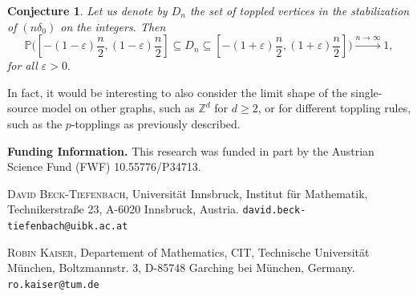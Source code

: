 \documentclass[11pt]{article}
\newtheorem{conj}{Conjecture}[section]
\newcommand{\Z}{\mathbb{Z}}
\newcommand{\prob}{\mathbb{P}}
\begin{document}
\begin{conj}
    Let us denote by $D_n$ the set of toppled vertices in the stabilization of $(n\delta_0)$ on the integers. Then
    $$\prob\bigg([-(1-\varepsilon)\frac{n}{2},(1-\varepsilon)\frac{n}{2}]\subseteq D_n \subseteq [-(1+\varepsilon)\frac{n}{2},(1+\varepsilon)\frac{n}{2}]\bigg)\xrightarrow{n\rightarrow\infty}1,$$
    for all $\varepsilon>0.$
\end{conj}
In fact, it would be interesting to also consider the limit shape of the single-source model on other graphs, such as $\Z^d$ for $d\geq 2$, or for different toppling rules, such as the $p$-topplings as previously described.  

\textbf{Funding Information.} This research was funded in part by the Austrian Science Fund (FWF) 10.55776/P34713.




\textsc{David Beck-Tiefenbach}, Universität Innsbruck, Institut für Mathematik, Technikerstraße 23, A-6020 Innsbruck, Austria. \texttt{david.beck-tiefenbach@uibk.ac.at}

\textsc{Robin Kaiser}, Departement of Mathematics, CIT, Technische Universität München, Boltzmannstr. 3, D-85748 Garching bei München, Germany. \texttt{ro.kaiser@tum.de}
\end{document}
